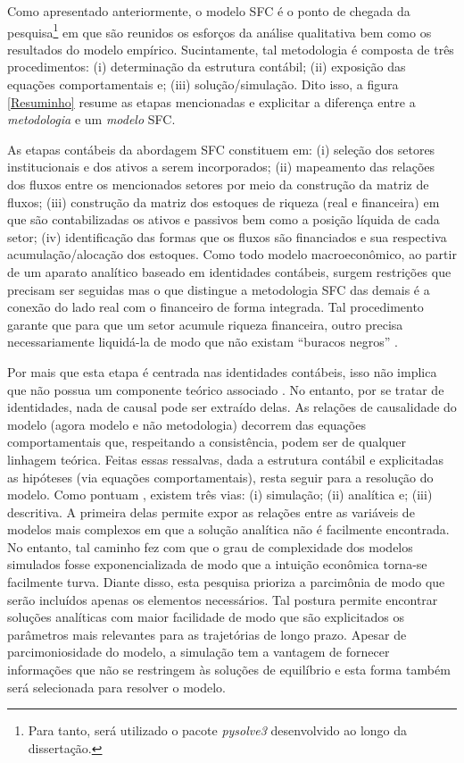 Como apresentado anteriormente, o modelo SFC é o ponto de chegada da pesquisa\footnote{Para tanto, será utilizado o pacote \textit{pysolve3} desenvolvido ao longo da dissertação.} em que são reunidos os esforços da análise qualitativa bem como os resultados do modelo empírico. Sucintamente, tal metodologia é composta de três procedimentos: (i) determinação da estrutura contábil; (ii) exposição das equações comportamentais e; (iii) solução/simulação. Dito isso, a figura \ref{Resuminho} resume as etapas mencionadas e explicitar a diferença entre a \textit{metodologia} e um \textit{modelo} SFC. 




As etapas contábeis da abordagem SFC constituem em: (i) seleção dos setores institucionais e dos ativos a serem incorporados; (ii) mapeamento das relações dos fluxos entre os mencionados setores por meio da construção da matriz de fluxos; (iii) construção da matriz dos estoques de riqueza (real e financeira) em que são contabilizadas os ativos e passivos  bem como a posição líquida de cada setor; (iv) identificação das formas que os fluxos são financiados e sua respectiva acumulação/alocação dos estoques. 
Como todo modelo macroeconômico, ao partir de um aparato analítico
baseado em identidades contábeis, surgem restrições que precisam ser seguidas mas o que distingue
a metodologia SFC das demais é a conexão do lado real com o financeiro de forma integrada.
Tal procedimento garante que para que um setor acumule riqueza financeira, outro precisa necessariamente liquidá-la de modo que não existam ``buracos negros'' \cite{godley_money_1996}.

Por mais que esta etapa é centrada nas identidades contábeis, isso não implica que não possua um componente teórico associado \cite[p.~15--16]{macedo_e_silva_peering_2011}.  No entanto, por se tratar de identidades, nada de causal pode ser extraído delas. As relações de causalidade do modelo (agora modelo e não metodologia) decorrem das equações comportamentais que, respeitando a consistência, podem ser de qualquer linhagem teórica. Feitas essas ressalvas, dada a estrutura contábil e explicitadas as hipóteses (via equações comportamentais), resta seguir para a resolução do modelo. Como pontuam \textcite{caverzasi_stock-flow_2013}, existem três vias: (i) simulação; (ii) analítica e; (iii) descritiva. A primeira delas permite expor as relações entre as variáveis de modelos mais complexos em que a solução analítica não é facilmente encontrada. No entanto, tal caminho fez com que o grau de complexidade dos modelos simulados fosse exponencializada de modo que a intuição econômica torna-se facilmente turva.  
Diante disso, esta pesquisa prioriza a parcimônia de modo que serão incluídos apenas os elementos necessários.
Tal postura permite encontrar soluções analíticas com maior facilidade de modo que são explicitados os parâmetros mais relevantes para as
trajetórias de longo prazo. 
Apesar de parcimoniosidade do modelo, a simulação tem a vantagem de fornecer informações que não se restringem às soluções de equilíbrio e esta forma também será selecionada para resolver o modelo. 
